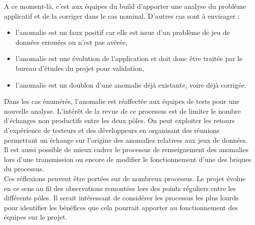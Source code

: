 \documentclass[12pt,a4paper]{article}
\begin{document}
A ce moment-là, c'est aux équipes du build d'apporter une analyse du problème applicatif et de la corriger dans le cas nominal.
\smallbreak
D'autres cas sont à envisager :
\smallbreak
\begin{itemize}
\item l'anomalie est un faux positif car elle est issue d'un problème de jeu de données erronées ou n'est pas avérée,
\item l'anomalie est une évolution de l'application et doit donc être traitée par le bureau d'études du projet pour validation,
\item l'anomalie est un doublon d'une anomalie déjà existante, voire déjà corrigée.
\end{itemize} 
\medbreak
Dans les cas énumérés, l'anomalie est réaffectée aux équipes de tests pour une nouvelle analyse. L'intérêt de la revue de ce processus est de limiter le nombre d'échanges non productifs entre les deux pôles. On peut exploiter les retours d'expérience de testeurs et des développeurs en organisant des réunions permettant un échange sur l'origine des anomalies relatives aux jeux de données. Il est aussi possible de mieux cadrer le processus de renseignement des anomalies lors d'une transmission ou encore de modifier le fonctionnement d'une des briques du processus.\\
Ces réflexions peuvent être portées sur de nombreux processus. Le projet évolue en ce sens au fil des observations remontées lors des points réguliers entre les différents pôles. Il serait intéressant de considérer les processus les plus lourds pour identifier les bénéfices que cela pourrait apporter au fonctionnement des équipes sur le projet.

\clearpage
\newpage
\end{document}
